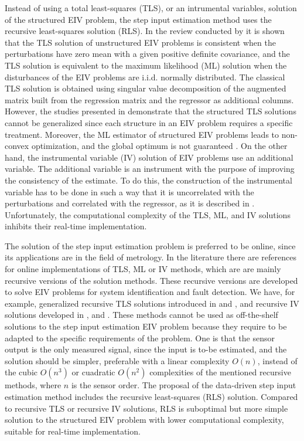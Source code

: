 \documentclass[11pt]{article}
\begin{document}
\begin{itemize}
	\color{blue}
	Instead of using a total least-squares (TLS), or an intrumental variables, solution of the structured EIV problem, the step input estimation method uses the recursive least-squares solution (RLS). 
    In the review conducted by \cite{Markovsky07overview} it is shown that the TLS solution of unstructured EIV problems is consistent when the perturbations have zero mean with a given positive definite covariance, and
    the TLS solution is equivalent to the maximum likelihood (ML) solution when the disturbances of the EIV problems are i.i.d. normally distributed. 
    The classical TLS solution is obtained using singular value decomposition of the augmented matrix built from the regression matrix and the regressor as additional columns.
    However, the studies presented in \cite{VanHuffel07TLSeditorial} demonstrate that the structured TLS solutions cannot be generalized since each structure in an EIV problem requires a specific treatment. 
    Moreover, the ML estimator of structured EIV problems leads to non-convex optimization, and the global optimum is not guaranteed \cite{Beck10}.
    On the other hand, the instrumental variable (IV) solution of EIV problems use an additional variable.
    The additional variable is an instrument with the purpose of improving the consistency of the estimate.
    To do this, the construction of the instrumental variable has to be done in such a way that it is uncorrelated with the perturbations and correlated with the regressor, as it is described in \cite{Soderstrom18}. 
    Unfortunately, the computational complexity of the TLS, ML, and IV solutions inhibits their real-time implementation.

    The solution of the step input estimation problem is preferred to be online, since its applications are in the field of metrology.
    In the literature there are references for online implementations of TLS, ML or IV methods, which are are mainly recursive versions of the solution methods.
    These recursive versions are developed to solve EIV problems for system identification and fault detection.
    We have, for example, generalized recursive TLS solutions introduced in \cite{Rhode14recursive} and \cite{Rhode14recursivecov}, and recursive IV solutions developed in \cite{Djouambi12}, \cite{Shang16} and \cite{Gil15}.
    These methods cannot be used as off-the-shelf solutions to the step input estimation EIV problem because they require to be adapted to the specific requirements of the problem.
    One is that the sensor output is the only measured signal, since the input is to-be estimated, and the solution should be simpler, preferable with a linear complexity $O(n)$, instead of the cubic $O(n^3)$ or cuadratic $O(n^2)$ complexities of the mentioned recursive methods, where $n$ is the sensor order.
    The proposal of the data-driven step input estimation method includes the recursive least-squares (RLS) solution.
    Compared to recursive TLS or recursive IV solutions, RLS is suboptimal but more simple solution to the structured EIV problem with lower computational complexity,  suitable for real-time implementation.
	\color{black}


\end{itemize}
\end{document}
